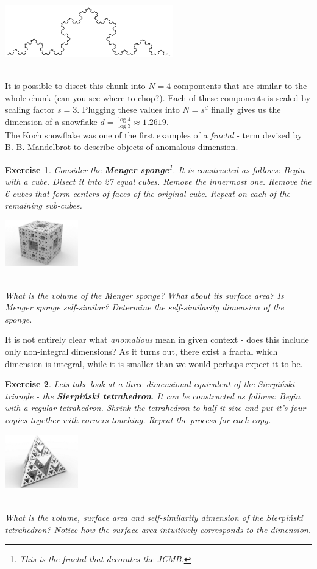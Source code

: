 \documentclass[12pt]{article}
\newtheorem{exercise}{Exercise}
\begin{document}
\centerline{\includegraphics{chunk}} \\
It is possible to disect this chunk into $N = 4$ compontents that are similar to the whole chunk (can you see where to chop?). Each of these components is scaled by scaling factor $s = 3$. Plugging these values into $N = s^d$ finally gives us the dimension of a snowflake $d = \frac{\log{4}}{\log{3}} \approx 1.2619$. \\
The Koch snowflake was one of the first examples of a \emph{fractal} - term devised by B. B. Mandelbrot to describe objects of anomalous dimension.

\begin{exercise}
Consider the \textbf{Menger sponge}\footnote{This is the fractal that decorates the JCMB.}. It is constructed as follows: Begin with a cube. Disect it into 27 equal cubes. Remove the innermost one. Remove the 6 cubes that form centers of faces of the original cube. Repeat on each of the remaining sub-cubes. \\
\centerline{\includegraphics[width = 120px]{sponge}} \\
What is the volume of the Menger sponge? What about its surface area? Is Menger sponge self-similar? Determine the self-similarity dimension of the sponge.
\end{exercise}

\noindent It is not entirely clear what \emph{anomalious} mean in given context - does this include only non-integral dimensions? As it turns out, there exist a fractal which dimension is integral, while it is smaller than we would perhaps expect it to be. 

\begin{exercise}
Lets take look at a three dimensional equivalent of the Sierpiński triangle - the \textbf{Sierpiński tetrahedron}. It can be constructed as follows:
Begin with a regular tetrahedron. Shrink the tetrahedron to half it size and put it's four copies together with corners touching. Repeat the process for each copy.\\
\centerline{\includegraphics[width = 120px]{tetrahedron}} \\
What is the volume, surface area and self-similarity dimension of the Sierpiński tetrahedron? Notice how the surface area intuitively corresponds to the dimension.
\end{exercise}
\end{document}
